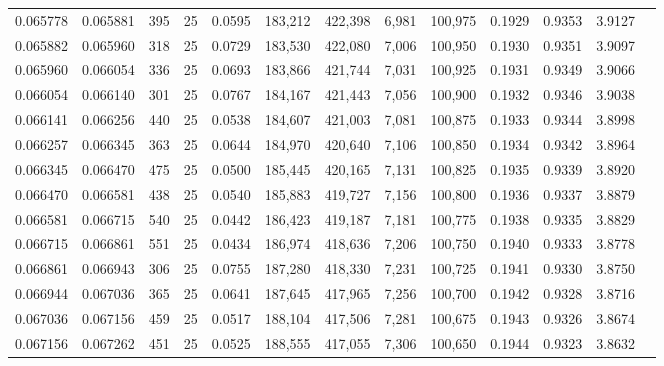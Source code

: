\begin{tabular}{rrrrrrrrrrrrr}
0.065778 & 0.065881 &   395 &  25 &                                     0.0595 & 183,212 & 422,398 &   6,981 & 100,975 & 0.1929 & 0.9353 & 3.9127 \\
0.065882 & 0.065960 &   318 &  25 &                                     0.0729 & 183,530 & 422,080 &   7,006 & 100,950 & 0.1930 & 0.9351 & 3.9097 \\
0.065960 & 0.066054 &   336 &  25 &                                     0.0693 & 183,866 & 421,744 &   7,031 & 100,925 & 0.1931 & 0.9349 & 3.9066 \\
0.066054 & 0.066140 &   301 &  25 &                                     0.0767 & 184,167 & 421,443 &   7,056 & 100,900 & 0.1932 & 0.9346 & 3.9038 \\
0.066141 & 0.066256 &   440 &  25 &                                     0.0538 & 184,607 & 421,003 &   7,081 & 100,875 & 0.1933 & 0.9344 & 3.8998 \\
0.066257 & 0.066345 &   363 &  25 &                                     0.0644 & 184,970 & 420,640 &   7,106 & 100,850 & 0.1934 & 0.9342 & 3.8964 \\
0.066345 & 0.066470 &   475 &  25 &                                     0.0500 & 185,445 & 420,165 &   7,131 & 100,825 & 0.1935 & 0.9339 & 3.8920 \\
0.066470 & 0.066581 &   438 &  25 &                                     0.0540 & 185,883 & 419,727 &   7,156 & 100,800 & 0.1936 & 0.9337 & 3.8879 \\
0.066581 & 0.066715 &   540 &  25 &                                     0.0442 & 186,423 & 419,187 &   7,181 & 100,775 & 0.1938 & 0.9335 & 3.8829 \\
0.066715 & 0.066861 &   551 &  25 &                                     0.0434 & 186,974 & 418,636 &   7,206 & 100,750 & 0.1940 & 0.9333 & 3.8778 \\
0.066861 & 0.066943 &   306 &  25 &                                     0.0755 & 187,280 & 418,330 &   7,231 & 100,725 & 0.1941 & 0.9330 & 3.8750 \\
0.066944 & 0.067036 &   365 &  25 &                                     0.0641 & 187,645 & 417,965 &   7,256 & 100,700 & 0.1942 & 0.9328 & 3.8716 \\
0.067036 & 0.067156 &   459 &  25 &                                     0.0517 & 188,104 & 417,506 &   7,281 & 100,675 & 0.1943 & 0.9326 & 3.8674 \\
0.067156 & 0.067262 &   451 &  25 &                                     0.0525 & 188,555 & 417,055 &   7,306 & 100,650 & 0.1944 & 0.9323 & 3.8632 \\

\end{tabular}
